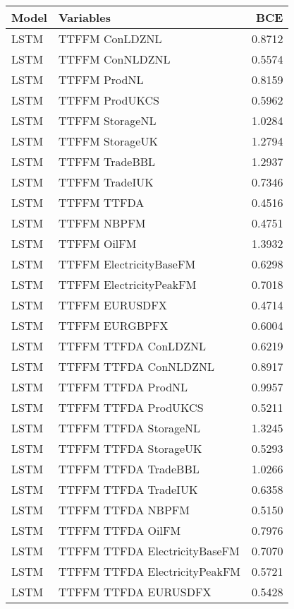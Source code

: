 \begin{table}[h!]
\centering
 \begin{adjustbox}{max width=\textwidth}
\begin{tabular}{llr}
  \hline
Model & Variables & BCE \\ 
  \hline
LSTM & TTFFM ConLDZNL & 0.8712 \\ 
  LSTM & TTFFM ConNLDZNL & 0.5574 \\ 
  LSTM & TTFFM ProdNL & 0.8159 \\ 
  LSTM & TTFFM ProdUKCS & 0.5962 \\ 
  LSTM & TTFFM StorageNL & 1.0284 \\ 
  LSTM & TTFFM StorageUK & 1.2794 \\ 
  LSTM & TTFFM TradeBBL & 1.2937 \\ 
  LSTM & TTFFM TradeIUK & 0.7346 \\ 
  LSTM & TTFFM TTFDA & 0.4516 \\ 
  LSTM & TTFFM NBPFM & 0.4751 \\ 
  LSTM & TTFFM OilFM & 1.3932 \\ 
  LSTM & TTFFM ElectricityBaseFM & 0.6298 \\ 
  LSTM & TTFFM ElectricityPeakFM & 0.7018 \\ 
  LSTM & TTFFM EURUSDFX & 0.4714 \\ 
  LSTM & TTFFM EURGBPFX & 0.6004 \\ 
  LSTM & TTFFM TTFDA ConLDZNL & 0.6219 \\ 
  LSTM & TTFFM TTFDA ConNLDZNL & 0.8917 \\ 
  LSTM & TTFFM TTFDA ProdNL & 0.9957 \\ 
  LSTM & TTFFM TTFDA ProdUKCS & 0.5211 \\ 
  LSTM & TTFFM TTFDA StorageNL & 1.3245 \\ 
  LSTM & TTFFM TTFDA StorageUK & 0.5293 \\ 
  LSTM & TTFFM TTFDA TradeBBL & 1.0266 \\ 
  LSTM & TTFFM TTFDA TradeIUK & 0.6358 \\ 
  LSTM & TTFFM TTFDA NBPFM & 0.5150 \\ 
  LSTM & TTFFM TTFDA OilFM & 0.7976 \\ 
  LSTM & TTFFM TTFDA ElectricityBaseFM & 0.7070 \\ 
  LSTM & TTFFM TTFDA ElectricityPeakFM & 0.5721 \\ 
  LSTM & TTFFM TTFDA EURUSDFX & 0.5428 \\ 

\end{tabular}
\end{adjustbox}
\end{table}
